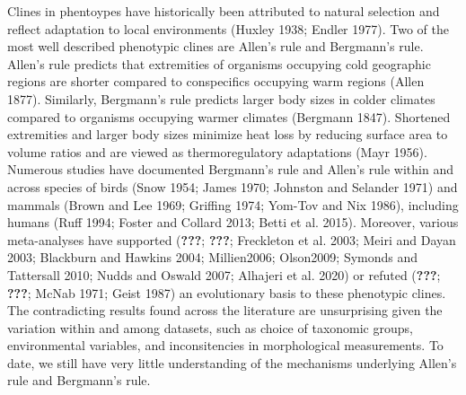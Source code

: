 \documentclass[]{article}
\begin{document}
Clines in phentoypes have historically been attributed to natural
selection and reflect adaptation to local environments (Huxley 1938;
Endler 1977). Two of the most well described phenotypic clines are
Allen's rule and Bergmann's rule. Allen's rule predicts that extremities
of organisms occupying cold geographic regions are shorter compared to
conspecifics occupying warm regions (Allen 1877). Similarly, Bergmann's
rule predicts larger body sizes in colder climates compared to organisms
occupying warmer climates (Bergmann 1847). Shortened extremities and
larger body sizes minimize heat loss by reducing surface area to volume
ratios and are viewed as thermoregulatory adaptations (Mayr 1956).
Numerous studies have documented Bergmann's rule and Allen's rule within
and across species of birds (Snow 1954; James 1970; Johnston and
Selander 1971) and mammals (Brown and Lee 1969; Griffing 1974; Yom-Tov
and Nix 1986), including humans (Ruff 1994; Foster and Collard 2013;
Betti et al. 2015). Moreover, various meta-analyses have supported
({\textbf{???}}; {\textbf{???}}; Freckleton et al. 2003; Meiri and Dayan
2003; Blackburn and Hawkins 2004; Millien2006; Olson2009; Symonds and
Tattersall 2010; Nudds and Oswald 2007; Alhajeri et al. 2020) or refuted
({\textbf{???}}; {\textbf{???}}; McNab 1971; Geist 1987) an evolutionary
basis to these phenotypic clines. The contradicting results found across
the literature are unsurprising given the variation within and among
datasets, such as choice of taxonomic groups, environmental variables,
and inconsitencies in morphological measurements. To date, we still have
very little understanding of the mechanisms underlying Allen's rule and
Bergmann's rule.
\end{document}
